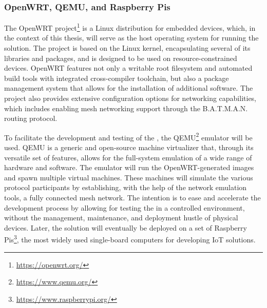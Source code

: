 \subsubsection{OpenWRT, QEMU, and Raspberry Pis}

The OpenWRT project\footnote{\url{https://openwrt.org/}} is a Linux distribution for embedded devices, which, in the context of this thesis, will serve as the host operating system for running the \poc{} solution. The project is based on the Linux kernel, encapsulating several of its libraries and packages, and is designed to be used on resource-constrained devices. OpenWRT features not only a writable root filesystem and automated build tools with integrated cross-compiler toolchain, but also a package management system that allows for the installation of additional software. The project also provides extensive configuration options for networking capabilities, which includes enabling mesh networking support through the B.A.T.M.A.N. routing protocol. 

To facilitate the development and testing of the \poc{}, the QEMU\footnote{\url{https://www.qemu.org/}} emulator will be used. QEMU is a generic and open-source machine virtualizer that, through its versatile set of features, allows for the full-system emulation of a wide range of hardware and software. The emulator will run the OpenWRT-generated images and spawn multiple virtual machines. These machines will simulate the various protocol participants by establishing, with the help of the network emulation tools, a fully connected mesh network. The intention is to ease and accelerate the development process by allowing for testing the \poc{} in a controlled environment, without the management, maintenance, and deployment hustle of physical devices. Later, the solution will eventually be deployed on a set of Raspberry Pis\footnote{\url{https://www.raspberrypi.org/}}, the most widely used single-board computers for developing IoT solutions.

